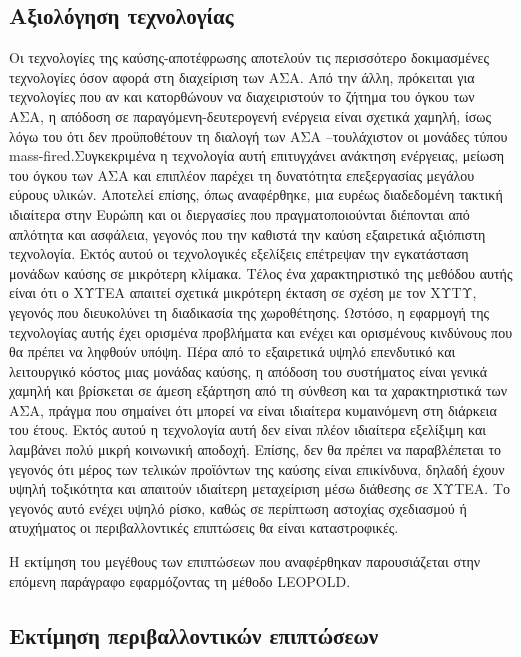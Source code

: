 \documentclass[12pt]{article}
\newcommand{\gr}{\selectlanguage{greek}}
\newcommand{\eng}{\selectlanguage{english}}
\begin{document}
 	\subsection{Αξιολόγηση τεχνολογίας}
 	
 	Οι τεχνολογίες της καύσης-αποτέφρωσης αποτελούν τις περισσότερο δοκιμασμένες τεχνολογίες όσον αφορά στη διαχείριση των ΑΣΑ. Από την άλλη, πρόκειται για τεχνολογίες που αν και κατορθώνουν να διαχειριστούν το ζήτημα του όγκου των ΑΣΑ, η απόδοση σε παραγόμενη-δευτερογενή ενέργεια είναι σχετικά χαμηλή, ίσως λόγω του ότι δεν προϋποθέτουν τη διαλογή των ΑΣΑ –τουλάχιστον οι μονάδες τύπου \eng mass-fired.\gr Συγκεκριμένα η τεχνολογία αυτή επιτυγχάνει ανάκτηση ενέργειας, μείωση του όγκου των ΑΣΑ και επιπλέον παρέχει τη δυνατότητα επεξεργασίας μεγάλου εύρους υλικών. Αποτελεί επίσης, όπως αναφέρθηκε, μια ευρέως διαδεδομένη τακτική ιδιαίτερα στην Ευρώπη και οι διεργασίες που πραγματοποιούνται διέπονται από απλότητα και ασφάλεια, γεγονός που την καθιστά την καύση εξαιρετικά αξιόπιστη τεχνολογία. Εκτός αυτού οι τεχνολογικές εξελίξεις επέτρεψαν την εγκατάσταση μονάδων καύσης σε μικρότερη κλίμακα. Τέλος ένα χαρακτηριστικό της μεθόδου αυτής είναι ότι ο ΧΥΤΕΑ απαιτεί σχετικά μικρότερη έκταση σε σχέση με τον ΧΥΤΥ, γεγονός που διευκολύνει τη διαδικασία της χωροθέτησης. Ωστόσο, η εφαρμογή της τεχνολογίας αυτής έχει ορισμένα προβλήματα και ενέχει και ορισμένους κινδύνους που θα πρέπει να ληφθούν υπόψη. Πέρα από το εξαιρετικά υψηλό επενδυτικό και λειτουργικό κόστος μιας μονάδας καύσης, η απόδοση του συστήματος είναι γενικά χαμηλή και βρίσκεται σε άμεση εξάρτηση από τη σύνθεση και τα χαρακτηριστικά των ΑΣΑ, πράγμα που σημαίνει ότι μπορεί να είναι ιδιαίτερα κυμαινόμενη στη διάρκεια του έτους.  Εκτός αυτού η τεχνολογία αυτή δεν είναι πλέον ιδιαίτερα εξελίξιμη και λαμβάνει πολύ μικρή κοινωνική αποδοχή. Επίσης, δεν θα πρέπει να παραβλέπεται το γεγονός ότι μέρος των τελικών προϊόντων της καύσης είναι επικίνδυνα, δηλαδή έχουν υψηλή τοξικότητα και απαιτούν ιδιαίτερη μεταχείριση μέσω διάθεσης σε ΧΥΤΕΑ. Το γεγονός αυτό ενέχει υψηλό ρίσκο, καθώς σε περίπτωση αστοχίας σχεδιασμού ή ατυχήματος οι περιβαλλοντικές επιπτώσεις θα είναι καταστροφικές.  
 	
 	Η εκτίμηση του μεγέθους των επιπτώσεων που αναφέρθηκαν παρουσιάζεται στην επόμενη παράγραφο εφαρμόζοντας τη μέθοδο \eng LEOPOLD.\gr
 	
 	\subsection{Εκτίμηση περιβαλλοντικών επιπτώσεων}
 	
\end{document}
